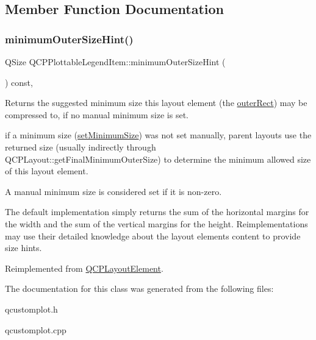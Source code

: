 \subsection{Member Function Documentation}
\mbox{\label{classQCPPlottableLegendItem_a8b543f3ac32b2fe59326e01c1101b3b8}} 
\subsubsection{\texorpdfstring{minimum\+Outer\+Size\+Hint()}{minimumOuterSizeHint()}}
{\footnotesize\ttfamily Q\+Size Q\+C\+P\+Plottable\+Legend\+Item\+::minimum\+Outer\+Size\+Hint (\begin{DoxyParamCaption}{ }\end{DoxyParamCaption}) const\hspace{0.3cm}{\ttfamily [protected]}, {\ttfamily [virtual]}}

Returns the suggested minimum size this layout element (the \hyperlink{classQCPLayoutElement_a2a32a12a6161c9dffbadeb9cc585510c}{outer\+Rect}) may be compressed to, if no manual minimum size is set.

if a minimum size (\hyperlink{classQCPLayoutElement_a5dd29a3c8bc88440c97c06b67be7886b}{set\+Minimum\+Size}) was not set manually, parent layouts use the returned size (usually indirectly through Q\+C\+P\+Layout\+::get\+Final\+Minimum\+Outer\+Size) to determine the minimum allowed size of this layout element.

A manual minimum size is considered set if it is non-\/zero.

The default implementation simply returns the sum of the horizontal margins for the width and the sum of the vertical margins for the height. Reimplementations may use their detailed knowledge about the layout element\textquotesingle{}s content to provide size hints. 

Reimplemented from \hyperlink{classQCPLayoutElement_a46789036c4fcb190fa374f91321d7c09}{Q\+C\+P\+Layout\+Element}.



The documentation for this class was generated from the following files\+:\begin{DoxyCompactItemize}
\item 
qcustomplot.\+h\item 
qcustomplot.\+cpp\end{DoxyCompactItemize}
